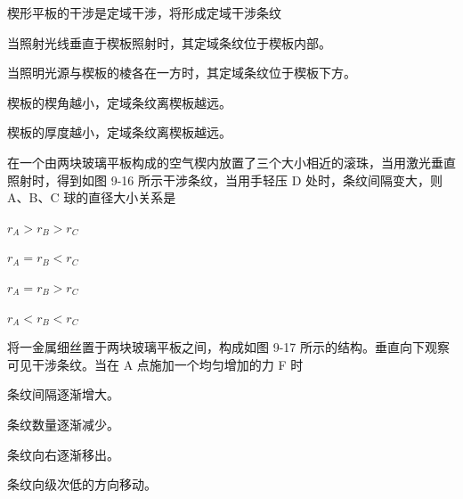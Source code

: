 \documentclass[padl, analysis, notocnum]{ExBook}
\newcommand{\answerarea}[1][3.5cm]{%
  \par\vspace{1mm}%
  \noindent{\color{themeColor!35}\rule{\linewidth}{0.4pt}}\par
  \noindent\begin{minipage}[t][#1][t]{\linewidth}\vspace{0pt}\end{minipage}\par
  \noindent{\color{themeColor!35}\rule{\linewidth}{0.4pt}}\par
}
\begin{document}
\begin{qitems}[startnum=11]
\qitem 楔形平板的干涉是定域干涉，将形成定域干涉条纹
\par\noindent\hspace{2em}当照射光线垂直于楔板照射时，其定域条纹位于楔板内部。
\par\noindent\hspace{2em}当照明光源与楔板的棱各在一方时，其定域条纹位于楔板下方。
\par\noindent\hspace{2em}楔板的楔角越小，定域条纹离楔板越远。
\par\noindent\hspace{2em}楔板的厚度越小，定域条纹离楔板越远。
\label{q:214:start}
\answerarea[4.0cm]
\label{q:214:end}
\end{qitems}

\begin{qitems}[startnum=12]
\qitem 在一个由两块玻璃平板构成的空气楔内放置了三个大小相近的滚珠，当用激光垂直照射时，得到如图 9-16 所示干涉条纹，当用手轻压 D 处时，条纹间隔变大，则 A、B、C 球的直径大小关系是
\par\noindent\hspace{2em}$r_{A}>r_{B}>r_{C}$
\par\noindent\hspace{2em}$r_{A}=r_{B}<r_{C}$
\par\noindent\hspace{2em}$r_{A}=r_{B}>r_{C}$
\par\noindent\hspace{2em}$r_{A}<r_{B}<r_{C}$
\label{q:215:start}
\answerarea[1.6cm]
\label{q:215:end}
\end{qitems}

\begin{qitems}[startnum=13]
\qitem 将一金属细丝置于两块玻璃平板之间，构成如图 9-17 所示的结构。垂直向下观察可见干涉条纹。当在 A 点施加一个均匀增加的力 F 时
\par\noindent\hspace{2em}条纹间隔逐渐增大。
\par\noindent\hspace{2em}条纹数量逐渐减少。
\par\noindent\hspace{2em}条纹向右逐渐移出。
\par\noindent\hspace{2em}条纹向级次低的方向移动。
\label{q:216:start}
\answerarea[1.6cm]
\label{q:216:end}
\end{qitems}
\end{document}

